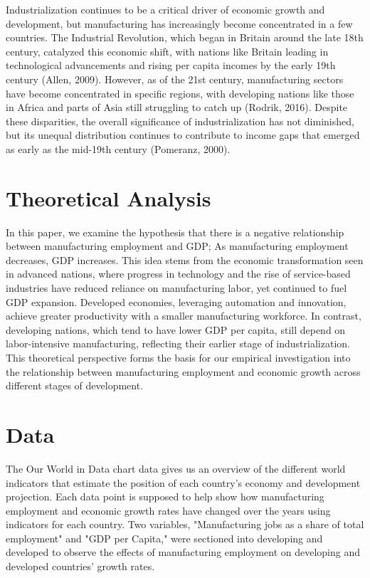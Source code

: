 \documentclass[12pt]{article}
\begin{document}
Industrialization continues to be a critical driver of economic growth and development, but manufacturing has increasingly become concentrated in a few countries. The Industrial Revolution, which began in Britain around the late 18th century, catalyzed this economic shift, with nations like Britain leading in technological advancements and rising per capita incomes by the early 19th century (Allen, 2009). However, as of the 21st century, manufacturing sectors have become concentrated in specific regions, with developing nations like those in Africa and parts of Asia still struggling to catch up (Rodrik, 2016). Despite these disparities, the overall significance of industrialization has not diminished, but its unequal distribution continues to contribute to income gaps that emerged as early as the mid-19th century (Pomeranz, 2000).

\section{Theoretical Analysis}
\label{sec:theory}
In this paper, we examine the hypothesis that there is a negative relationship between manufacturing employment and GDP; As manufacturing employment decreases, GDP increases. This idea stems from the economic transformation seen in advanced nations, where progress in technology and the rise of service-based industries have reduced reliance on manufacturing labor, yet continued to fuel GDP expansion. Developed economies, leveraging automation and innovation, achieve greater productivity with a smaller manufacturing workforce. In contrast, developing nations, which tend to have lower GDP per capita, still depend on labor-intensive manufacturing, reflecting their earlier stage of industrialization. This theoretical perspective forms the basis for our empirical investigation into the relationship between manufacturing employment and economic growth across different stages of development.


\section{Data}
\label{sec:data}


The Our World in Data chart data gives us an overview of the different world indicators that estimate the position of each country's economy and development projection. Each data point is supposed to help show how manufacturing employment and economic growth rates have changed over the years using indicators for each country. Two variables, "Manufacturing jobs as a share of total employment" and "GDP per Capita," were sectioned into developing and developed to observe the effects of manufacturing employment on developing and developed countries' growth rates.
\end{document}
